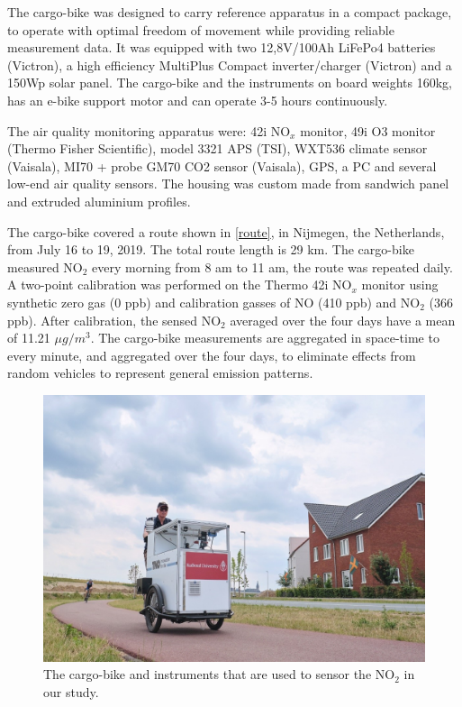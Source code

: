 \documentclass{article}
\begin{document}
The cargo-bike was designed to carry reference apparatus in a compact package, to operate with optimal freedom of movement while providing reliable measurement data. It was equipped with two 12,8V/100Ah LiFePo4 batteries (Victron), a high efficiency MultiPlus Compact inverter/charger (Victron) and a 150Wp solar panel. 
The cargo-bike and the instruments on board weights 160kg, has an e-bike support motor and can operate 3-5 hours continuously.

The air quality monitoring apparatus were: 42i NO$_x$ monitor, 49i O3 monitor (Thermo Fisher Scientific), model 3321 APS (TSI), WXT536 climate sensor (Vaisala), MI70 + probe GM70 CO2 sensor (Vaisala), GPS, a PC and several low-end air quality sensors. The housing was custom made from sandwich panel and extruded aluminium profiles. 

The cargo-bike covered a route shown in \cref{route}, in Nijmegen, the Netherlands, from July 16 to 19, 2019. The total route length is 29 km. The cargo-bike measured NO$_2$ every morning from 8 am to 11 am, the route was repeated daily. A two-point calibration was performed on the Thermo 42i NO$_x$ monitor using synthetic zero gas (0 ppb) and calibration gasses of NO (410 ppb) and NO$_2$ (366 ppb). After calibration, the sensed NO$_2$ averaged over the four days have a mean of 11.21 $\mu g/m^3$. The cargo-bike measurements are aggregated in space-time to every minute, and aggregated over the four days, to eliminate effects from random vehicles to represent general emission patterns.    



\begin{figure}[H]
    \includegraphics[scale = 0.8,trim=1cm 0cm 3cm 2cm, clip=true]{f1a.jpg}
    
    \caption {The cargo-bike and instruments that are used to sensor the NO$_2$ in our study.}
    \label{bike}
\end{figure}
\end{document}
